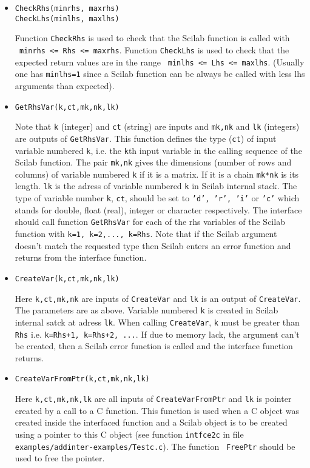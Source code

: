 \begin{itemize}
\item{
\begin{verbatim}
CheckRhs(minrhs, maxrhs)
CheckLhs(minlhs, maxlhs)
\end{verbatim}
Function \verb!CheckRhs! is used to check that the Scilab function is called
with \\
{\verb! minrhs <= Rhs <= maxrhs!}. 
Function \verb!CheckLhs! is used to check that the expected return
values are in the range 
{\verb! minlhs <= Lhs <= maxlhs!}. (Usually one has {\tt minlhs=1}
since a Scilab function can be always be called with less lhs
arguments than expected).
}
\item{
\begin{verbatim}
GetRhsVar(k,ct,mk,nk,lk)
\end{verbatim}
Note that \verb!k! (integer) and \verb!ct! (string) are inputs and 
\verb!mk,nk! and \verb!lk! (integers) are outputs of \verb!GetRhsVar!.
This function defines the type (\verb!ct!) of input variable numbered
\verb!k!, i.e. the \verb!k!th input variable in the calling sequence of the 
Scilab function. The pair \verb!mk,nk! gives the dimensions (number of rows
and columns)  of variable numbered \verb!k! if it is a matrix. 
If it is a chain \verb!mk*nk! is its length. \verb!lk! is the adress
of variable numbered \verb!k! in Scilab internal stack.
The type of variable number \verb!k!, \verb!ct!, should be set 
to {\tt 'd', 'r', 'i'} or {\tt 'c'} which stands for double, float
(real), integer
or character respectively. The interface should call function
\verb!GetRhsVar! for each of the rhs variables of the Scilab function
with {\tt k=1, k=2,..., k=Rhs}.
Note that if the Scilab argument doesn't match the requested type then 
Scilab enters an error function and returns from the interface function.
}
\item{
\begin{verbatim}
CreateVar(k,ct,mk,nk,lk)
\end{verbatim}
Here \verb!k,ct,mk,nk! are inputs of \verb!CreateVar! and \verb!lk! is an
output of \verb!CreateVar!. The parameters are as above. Variable numbered
\verb!k! is created in Scilab internal satck at adress {\tt lk}. When
calling {\tt CreateVar}, {\tt k} must be greater than {\tt Rhs} i.e.
{\tt k=Rhs+1, k=Rhs+2, ...}.
If due to memory lack, the argument can't be created, then a Scilab error 
function is called and the interface function returns.
}
\item{
\begin{verbatim}
CreateVarFromPtr(k,ct,mk,nk,lk)
\end{verbatim}
Here \verb!k,ct,mk,nk,lk! are all inputs of \verb!CreateVarFromPtr! and
\verb!lk! is pointer created by a call to a C function. This function is used 
when a C object was created inside the interfaced function and a Scilab 
object is to be created using a pointer to this C object 
(see function {\tt intfce2c} 
in file { \tt examples/addinter-examples/Testc.c}). The function {\tt
FreePtr} should be used to free the pointer.
}
\end{itemize}

